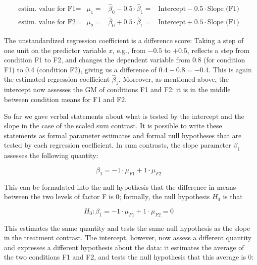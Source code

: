 \documentclass[12pt,]{krantz}
\begin{document}
\begin{equation}
\begin{array}{lccll}
\text{estim. value for F1} = & \hat{\mu}_1 = & \hat{\beta}_0 - 0.5 \cdot \hat{\beta}_1 = & \text{Intercept} - 0.5 \cdot \text{Slope (F1)}\\
\text{estim. value for F2} = & \hat{\mu}_2 = & \hat{\beta}_0 + 0.5 \cdot \hat{\beta}_1 = & \text{Intercept} + 0.5 \cdot \text{Slope (F1)}
\end{array}
\label{eq:predVal2}
\end{equation}

The unstandardized regression coefficient is a difference score: Taking a step of one unit on the predictor variable \(x\), e.g., from \(-0.5\) to \(+0.5\), reflects a step from condition F1 to F2, and changes the dependent variable from \(0.8\) (for condition F1) to \(0.4\) (condition F2), giving us a difference of \(0.4 - 0.8 = -0.4\). This is again the estimated regression coefficient \(\hat{\beta}_1\).
Moreover, as mentioned above, the intercept now assesses the GM of conditions F1 and F2: it is in the middle between condition means for F1 and F2.

So far we gave verbal statements about what is tested by the intercept and the slope in the case of the scaled sum contrast. It is possible to write these statements as formal parameter estimates and formal null hypotheses that are tested by each regression coefficient.
In sum contrasts, the slope parameter \(\beta_1\) assesses the following quantity:

\begin{equation}
\beta_1 = -1 \cdot \mu_{F1} + 1 \cdot \mu_{F2}
\end{equation}

\noindent
This can be formulated into the null hypothesis that the difference in means between the two levels of factor F is 0; formally, the null hypothesis \(H_0\) is that

\begin{equation}
H_0: \beta_1 = -1 \cdot \mu_{F1} + 1 \cdot \mu_{F2} = 0
\end{equation}

\noindent
This estimates the same quantity and tests the same null hypothesis as the slope in the treatment contrast.
The intercept, however, now assess a different quantity and expresses a different hypothesis about the data: it estimates the average of the two conditions F1 and F2, and tests the null hypothesis that this average is 0:
\end{document}
